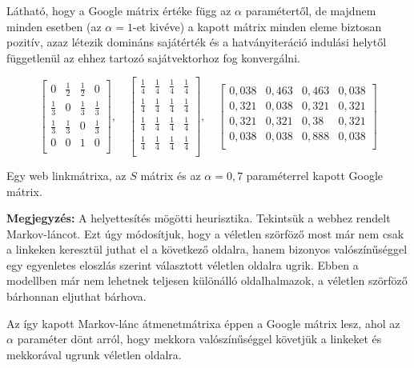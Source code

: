 \documentclass[12pt,a4paper]{article}
\begin{document}
Látható, hogy a Google mátrix értéke függ az $\alpha$ paramétertől, de majdnem minden esetben (az $\alpha = 1$-et kivéve) a kapott mátrix minden eleme biztosan pozitív, azaz létezik domináns sajátérték és a hatványiteráció indulási helytől függetlenül az ehhez tartozó sajátvektorhoz fog konvergálni.
\vspace{0.1 cm}

\[
\begin{bmatrix}
0 & \frac{1}{2} & \frac{1}{2} & 0 \\
\frac{1}{3} & 0 & \frac{1}{3} & \frac{1}{3} \\
\frac{1}{3} & \frac{1}{3} & 0 & \frac{1}{3} \\
0 & 0 & 1 & 0 \\
\end{bmatrix}, \quad
\begin{bmatrix}
\frac{1}{4} & \frac{1}{4} & \frac{1}{4} & \frac{1}{4} \\
\frac{1}{4} & \frac{1}{4} & \frac{1}{4} & \frac{1}{4} \\
\frac{1}{4} & \frac{1}{4} & \frac{1}{4} & \frac{1}{4} \\
\frac{1}{4} & \frac{1}{4} & \frac{1}{4} & \frac{1}{4} \\
\end{bmatrix}, \quad
\begin{bmatrix}
0,038 & 0,463 & 0,463 & 0,038 \\
0,321 & 0,038 & 0,321 & 0,321 \\
0,321 & 0,321 & 0,38 & 0,321 \\
0,038 & 0,038 & 0,888 & 0,038 \\
\end{bmatrix}
\]

\vspace{0.1 cm}
\centerline{Egy web linkmátrixa, az $S$ mátrix és az $\alpha = 0,7$ paraméterrel kapott Google mátrix.}
\vspace{0.3 cm}

\textbf{Megjegyzés:} A helyettesítés mögötti heurisztika. \newline
Tekintsük a webhez rendelt Markov-láncot. Ezt úgy módosítjuk, hogy a véletlen szörföző most már nem csak a linkeken keresztül juthat el a következő oldalra, hanem bizonyos valószínűséggel egy egyenletes eloszlás szerint választott véletlen oldalra ugrik. Ebben a modellben már nem lehetnek teljesen különálló oldalhalmazok, a véletlen szörföző bárhonnan eljuthat bárhova.

Az így kapott Markov-lánc átmenetmátrixa éppen a Google mátrix lesz, ahol az $\alpha$ paraméter dönt arról, hogy mekkora valószínűséggel követjük a linkeket és mekkorával ugrunk véletlen oldalra.
\end{document}
